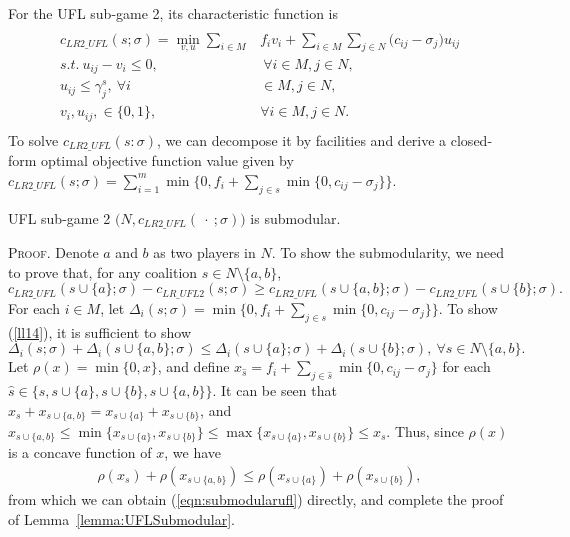 \documentclass[ijoc,nonblindrev]{informs3} %
\begin{document}
For the UFL sub-game 2, its characteristic function is
\begin{eqnarray}\label{eqn:UFLCFsub2}
\begin{aligned}
\begin{split}
c_{LR2\_UFL}(s;\sigma) = \min_{v,u} \sum_{i \in M} &f_iv_i + \sum_{i \in M} \sum_{j \in N} \big(c_{ij} - \sigma_{j}\big)u_{ij}\\
s.t.~u_{ij} - v_i \leq 0,&~\forall i \in M, j \in N,\\
u_{ij} \leq \gamma_j^s,~\forall i& \in M, j \in N,\\
 v_i,u_{ij}, \in \{0,1\},~&\forall i \in M, j \in N.
\end{split}
\end{aligned}
\end{eqnarray}
To solve $c_{LR2\_UFL}(s:\sigma)$, we can decompose it by facilities and derive a closed-form optimal objective function value given by $c_{LR2\_UFL}(s;\sigma) = \sum_{i=1}^m \min \big\{0,f_i+\sum_{j \in s} \min \{0,c_{ij}-\sigma_j\}\big\}$.

\begin{lemma}\label{lemma:UFLSubmodular}
UFL sub-game 2 $\big(N,c_{LR2\_UFL}(\ \cdot \ ;\sigma)\big)$ is submodular.
\end{lemma}
{\scshape Proof.}
Denote $a$ and $b$ as two players in $N$. To show the submodularity, we need to prove that, for any coalition $s \in N\setminus \big\{a,b\big\}$,
\begin{equation}\label{ll14}
c_{LR2\_UFL}(s \cup \{a\}; \sigma) - c_{LR\_UFL2}(s;\sigma) \geq c_{LR2\_UFL}(s \cup \big\{a,b\big\};\sigma) - c_{LR2\_UFL}(s \cup \{b\};\sigma).
\end{equation}
For each $i\in M$, let $\Delta_i(s;\sigma) = \min \{0, f_i + \sum_{j \in s} \min \{0, c_{ij} - \sigma_j\} \}$. To show (\ref{ll14}), it is  sufficient to show
\begin{equation}\label{eqn:submodularufl}
\Delta_i(s;\sigma) + \Delta_i(s \cup \{a,b\};\sigma) \leq \Delta_i(s \cup \{a\};\sigma) + \Delta_i(s \cup \{b\};\sigma), ~\forall s \in N\setminus\big\{a,b\big\}. \end{equation} 
Let $\rho(x)=\min\{0,x\}$, and define $x_{\hat{s}}= f_i + \sum_{j \in \hat{s}} \min \{0, c_{ij} - \sigma_j\}$ for each $\hat{s}\in \{s,s\cup\{a\},s\cup\{b\},s\cup\{a,b\}\}$. 
It can be seen that $x_s+x_{s\cup\{a,b\}} = x_{s\cup \{a\}}+x_{s\cup\{b\}}$, and $x_{s\cup\{a,b\}}\leq \min\{x_{s\cup \{a\}},x_{s\cup\{b\}}\}\leq  \max\{x_{s\cup \{a\}},x_{s\cup\{b\}}\} \leq x_{s}$.
Thus, since $\rho(x)$ is a concave function of $x$, we have
\begin{eqnarray*}
  \rho(x_s) + \rho(x_{s\cup \{a,b\}}) \leq \rho(x_{s\cup\{a\}}) + \rho(x_{s\cup \{b\}}),
\end{eqnarray*}
from which we can obtain (\ref{eqn:submodularufl}) directly, and complete the proof of Lemma~\ref{lemma:UFLSubmodular}.
\hfill\Halmos
\end{document}
